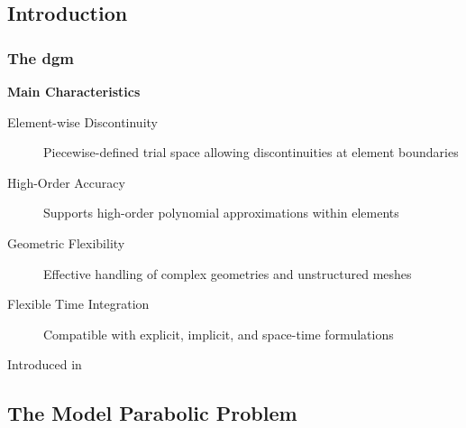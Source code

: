 \subsection{Introduction}

\begin{frame}
    \frametitle{The \acrfull{dgm}}

    \vspace*{\fill}
    \begin{center}
        {\color{\accentcolor} \Large \textbf{Main Characteristics}}
    \end{center}

    \vspace*{0.25cm}

    \begin{center}
        \begin{minipage}{0.75\textwidth}
            \begin{description}
                \item[Element-wise Discontinuity] Piecewise-defined trial space allowing discontinuities at element boundaries
                \item[High-Order Accuracy] Supports high-order polynomial approximations within elements
                \item[Geometric Flexibility] Effective handling of complex geometries and unstructured meshes
                \item[Flexible Time Integration] Compatible with explicit, implicit, and space-time formulations
            \end{description}
        \end{minipage}
    \end{center}

    \vspace*{\fill}

    \begin{flushleft}
        \begin{minipage}{0.75\textwidth}
            {\footnotesize Introduced in }
        \end{minipage}
    \end{flushleft}

\end{frame}

\subsection{The Model Parabolic Problem}

